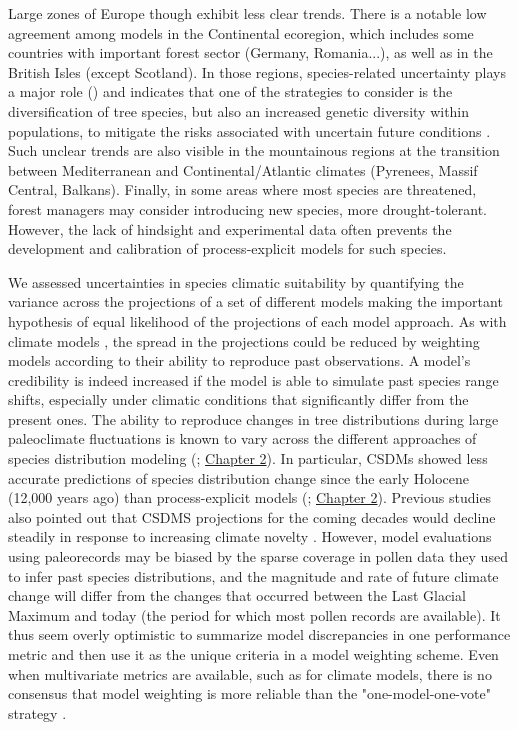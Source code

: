 Large zones of Europe though exhibit less clear trends. There is a notable low agreement among models in the Continental ecoregion, which includes some countries with important forest sector (Germany, Romania...), as well as in the British Isles (except Scotland). In those regions, species-related uncertainty plays a major role () and indicates that one of the strategies to consider is the diversification of tree species, but also an increased genetic diversity within populations, to mitigate the risks associated with uncertain future conditions \citep{Morin2014, Ammer2019, Pretzsch2021, Vospernik2024}. Such unclear trends are also visible in the mountainous regions at the transition between Mediterranean and Continental/Atlantic climates (Pyrenees, Massif Central, Balkans). Finally, in some areas where most species are threatened, forest managers may consider introducing new species, more drought-tolerant. However, the lack of hindsight and experimental data often prevents the development and calibration of process-explicit models for such species.

We assessed uncertainties in species climatic suitability by quantifying the variance across the projections of a set of different models making the important hypothesis of equal likelihood of the projections of each model approach. As with climate models \citep{IPCC2021}, the spread in the projections could be reduced by weighting models according to their ability to reproduce past observations. A model’s credibility is indeed increased if the model is able to simulate past species range shifts, especially under climatic conditions that significantly differ from the present ones. The ability to reproduce changes in tree distributions during large paleoclimate fluctuations is known to vary across the different approaches of species distribution modeling (\citealp{VanderMeersch2024}; \hyperref[chapter2]{Chapter 2}). In particular, CSDMs showed less accurate predictions of species distribution change since the early Holocene (12,000 years ago) than process-explicit models (\citealp{VanderMeersch2024}; \hyperref[chapter2]{Chapter 2}). Previous studies also pointed out that CSDMS projections for the coming decades would decline steadily  in response to increasing climate novelty \citep{Fitzpatrick2018}. However, model evaluations using paleorecords may be biased by the sparse coverage in pollen data they used to infer past species distributions, and the magnitude and rate of future climate change will differ from the changes that occurred between the Last Glacial Maximum and today (the period for which most pollen records are available). 
It thus seem overly optimistic to summarize model discrepancies in one performance metric and then use it as the unique criteria in a model weighting scheme. Even when multivariate metrics are available, such as for climate models, there is no consensus that model weighting is more reliable than the "one-model-one-vote" strategy \citep{IPCC2021}.

